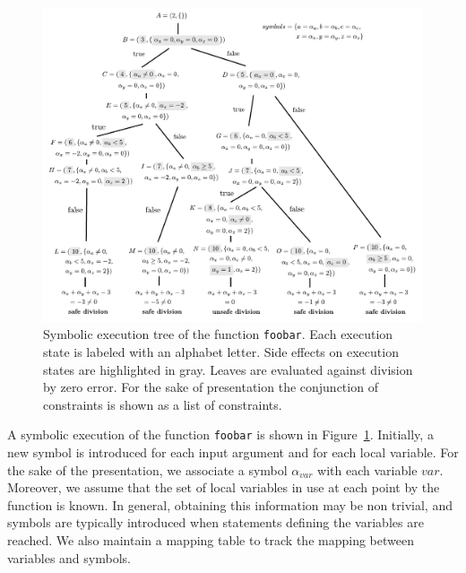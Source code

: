 \begin{figure}[t]
  \centering
  \includegraphics[width=1.0\columnwidth]{images/example} 
  \caption{Symbolic execution tree of the function {\tt foobar}. Each execution state is labeled with an alphabet letter. Side effects on execution states are highlighted in gray. Leaves are evaluated against division by zero error. For the sake of presentation the conjunction of constraints is shown as a list of constraints. }
  \label{fig:example-symbolic-execution}
\end{figure}

A symbolic execution of the function {\tt foobar} is shown in Figure~\ref{fig:example-symbolic-execution}. Initially, a new symbol is introduced for each input argument and for each local variable. For the sake of the presentation, we associate a symbol $\alpha_{var}$ with each variable $var$. 
Moreover, we assume that the set of local variables in use at each point by the function is known. In general, obtaining this information may be non trivial, and symbols are typically introduced when statements defining the variables are reached.
We also maintain a mapping table to track the mapping between variables and symbols. 

